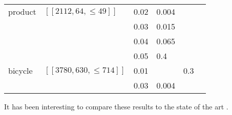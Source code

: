\documentclass[12pt]{article}
\begin{document}
\begin{center}
\begin{tabular}{|l|l|l||l|l|l| }
\hline
\hline
product     & $[[2112, 64, \le 49]]$ & 0.02  & 0.004   &   &   \\
            &                        & 0.03  & 0.015   &    &   \\
            &                        & 0.04  & 0.065   &    &   \\
            &                        & 0.05  & 0.4  &    &   \\
\hline
\hline
bicycle     & $[[3780, 630, \le 714]]$ & 0.01  &         & 0.3    &   \\
            &                          & 0.03  & 0.004   &    &   \\
\hline
\end{tabular}
\end{center}

It has been interesting to compare these results to the state of
the art \cite{kovalev2018}.

{}

\end{document}
